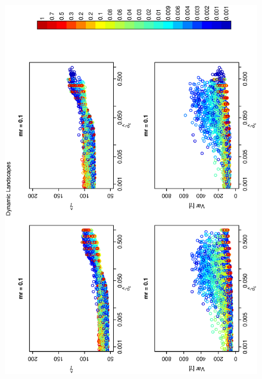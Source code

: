 \documentclass[12pt]{article}
\begin{document}
\begin{figure}[hb!]
\hspace{-0.5 in}\includegraphics[width=5in,angle=-90]{./figures/radius_vs_gamma_3_2.eps}
\caption{}
\label{fig:SI-D3}
\end{figure}
\end{document}
